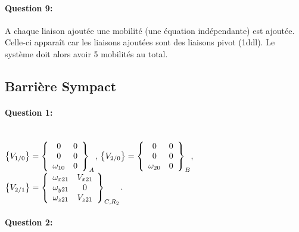 \paragraph{Question 9:} A chaque liaison ajoutée une mobilité (une équation indépendante) est ajoutée. Celle-ci apparaît car les liaisons ajoutées sont des liaisons pivot (1ddl). Le système doit alors avoir 5 mobilités au total.

\subsection{Barrière Sympact}

\paragraph{Question 1:} ~\ \\

$\left\{V_{1/0}\right\}=\left\{\begin{array}{c c}
0 & 0 \\ 0 & 0 \\ \omega_{10} & 0 
\end{array}\right\}_A$,
$\left\{V_{2/0}\right\}=\left\{\begin{array}{c c}
0 & 0 \\ 0 & 0 \\ \omega_{20} & 0 
\end{array}\right\}_B$,
$\left\{V_{2/1}\right\}=\left\{\begin{array}{c c}
\omega_{x21} & V_{x21} \\ \omega_{y21} & 0 \\ \omega_{z21} & V_{z21} 
\end{array}\right\}_{C,R_2}$.

\paragraph{Question 2:} ~\ \\


